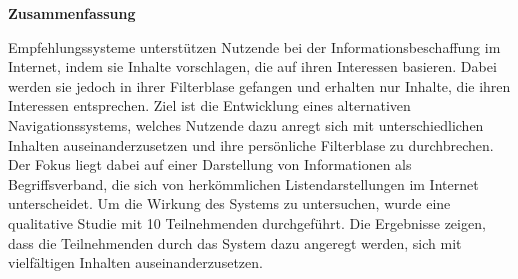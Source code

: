 \newpage

\thispagestyle{empty}

\vspace*{1cm}
\begin{center}
    {\Huge \bf Zusammenfassung}
\end{center}
\vspace*{1.4cm}

Empfehlungssysteme unterstützen Nutzende bei der Informationsbeschaffung im Internet, indem sie Inhalte vorschlagen, die auf ihren Interessen basieren.
Dabei werden sie jedoch in ihrer Filterblase gefangen und erhalten nur Inhalte, die ihren Interessen entsprechen.
Ziel ist die Entwicklung eines alternativen Navigationssystems, welches Nutzende dazu anregt sich mit unterschiedlichen Inhalten auseinanderzusetzen und ihre persönliche Filterblase zu durchbrechen.
Der Fokus liegt dabei auf einer Darstellung von Informationen als Begriffsverband, die sich von herkömmlichen Listendarstellungen im Internet unterscheidet.
Um die Wirkung des Systems zu untersuchen, wurde eine qualitative Studie mit 10 Teilnehmenden durchgeführt.
Die Ergebnisse zeigen, dass die Teilnehmenden durch das System dazu angeregt werden, sich mit vielfältigen Inhalten auseinanderzusetzen.
